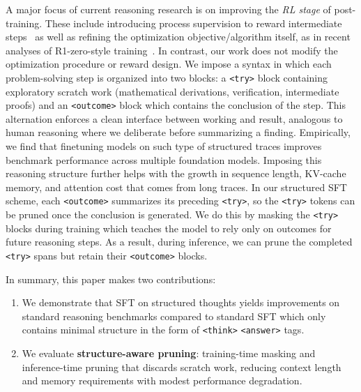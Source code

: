 \documentclass{article}
\begin{document}
 
A major focus of current reasoning research is on improving the \emph{RL stage} of post-training. These include introducing process supervision to reward intermediate steps~\citep{lightman2023let,uesato2022solving, shao2024deepseekmath} as well as refining the optimization objective/algorithm itself, as in recent analyses of R1-zero-style training~\citep{liu2503understanding}. In contrast, our work does not modify the optimization procedure or reward design. We impose a syntax in which each problem-solving step is organized into two blocks: a \texttt{<try>} block containing exploratory scratch work (mathematical derivations, verification, intermediate proofs) and an \texttt{<outcome>} block which contains the conclusion of the step. This alternation enforces a clean interface between working and result, analogous to human reasoning where we deliberate before summarizing a finding. Empirically, we find that finetuning models on such type of structured traces improves benchmark performance across multiple foundation models.
Imposing this reasoning structure further helps with the growth in sequence length, KV-cache memory, and attention cost that comes from long traces. In our structured SFT scheme, each \texttt{<outcome>} summarizes its preceding \texttt{<try>}, so the \texttt{<try>} tokens can be pruned once the conclusion is generated.  We do this by masking the \texttt{<try>} blocks during training which teaches the model to rely only on outcomes for future reasoning steps. As a result, during inference, we can prune the completed \texttt{<try>} spans but retain their \texttt{<outcome>} blocks.

In summary, this paper makes two contributions:
\begin{enumerate}[leftmargin=*]
    \item We demonstrate that SFT on structured thoughts yields improvements on standard reasoning benchmarks compared to standard SFT which only contains minimal structure in the form of \texttt{<think>} \texttt{<answer>} tags.
    \item We evaluate \textbf{structure-aware pruning}: training-time masking and inference-time pruning that discards scratch work, reducing context length and memory requirements with modest performance degradation.
\end{enumerate}
\end{document}
